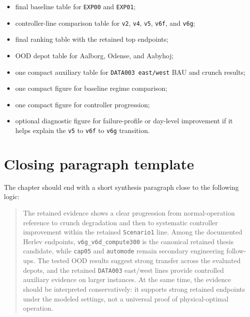 \begin{itemize}
    \item final baseline table for \texttt{EXP00} and \texttt{EXP01};
    \item controller-line comparison table for \texttt{v2}, \texttt{v4}, \texttt{v5}, \texttt{v6f}, and \texttt{v6g};
    \item final ranking table with the retained top endpoints;
    \item OOD depot table for Aalborg, Odense, and Aabyhoj;
    \item one compact auxiliary table for \texttt{DATA003 east/west} BAU and crunch results;
    \item one compact figure for baseline regime comparison;
    \item one compact figure for controller progression;
    \item optional diagnostic figure for failure-profile or day-level improvement if it helps explain the \texttt{v5} to \texttt{v6f} to \texttt{v6g} transition.
\end{itemize}

\section{Closing paragraph template}
\label{sec:results-closing-template}

The chapter should end with a short synthesis paragraph close to the following logic:

\begin{quote}
The retained evidence shows a clear progression from normal-operation reference to crunch degradation and then to systematic controller improvement within the retained \texttt{Scenario1} line.
Among the documented Herlev endpoints, \texttt{v6g\_v6d\_compute300} is the canonical retained thesis candidate, while \texttt{cap05} and \texttt{automode} remain secondary engineering follow-ups.
The tested OOD results suggest strong transfer across the evaluated depots, and the retained \texttt{DATA003} east/west lines provide controlled auxiliary evidence on larger instances.
At the same time, the evidence should be interpreted conservatively: it supports strong retained endpoints under the modeled settings, not a universal proof of physical-optimal operation.
\end{quote}
